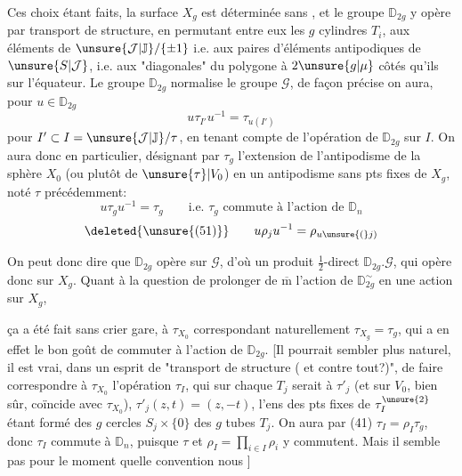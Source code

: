 


Ces choix étant faits, la surface $X_g$ est déterminée sans
, et le groupe $\mathbb D_{2g}$ y opère par transport de
structure, en permutant entre eux les $g$ cylindres $T_i$,
 aux éléments de
$\unsure{\mathcal J|\mathbb J}/\{\pm1\}$ i.e.
aux paires d'éléments antipodiques de $\unsure{S|\mathcal J}$,
i.e. aux "diagonales" du polygone à $2\unsure{g|\mu}$ côtés
qu'ils 
sur l'équateur. Le groupe $\mathbb D_{2g}$ normalise
 le groupe $\mathcal G$, de façon précise
on aura, pour $u\in\mathbb D_{2g}$
\[
\tag{49}
u\tau_{I'}u^{-1}=\tau_{u(I')}
\]
pour $I'\subset I=\unsure{\mathcal J|\mathbb J}/\tau$, en tenant compte de
l'opération de $\mathbb D_{2g}$ sur $I$. On aura donc en
particulier, désignant par $\tau_g$\inserted{$=\tau_\varnothing$}
l'extension  de l'antipodisme de la sphère $X_0$
(ou plutôt de $\unsure{\tau}\vert V_0$) en un antipodisme
sans pts fixes de $X_g$, noté $\tau$ précédemment:
\[
\tag{50}
u\tau_g u^{-1}=\tau_g
\qquad\text{i.e. $\tau_g$ commute à l'action de $\mathbb D_n$}
\]
\[
\deleted{\unsure{(51)}}\qquad
u\rho_j u^{-1}=\rho_{u\unsure{(}j)}
\]

On peut donc dire que $\mathbb D_{2g}$ opère sur $\mathcal G$,
d'où un produit $\frac12$-direct $\mathbb D_{2g}.\mathcal G$,
qui opère donc sur $X_g$.
Quant à la question de prolonger de $\overline{\mathrm m}$
l'action  de $\mathbb D_{2g}^\sim$
  en une action sur $X_g$,



ça a été fait sans crier gare, à $\tau_{X_0}$ correspondant
naturellement $\tau_{X_g}=\tau_g$, qui a en effet le bon goût
de commuter à l'action de $\mathbb D_{2g}$.
[Il pourrait sembler plus naturel, il est vrai, dans un
esprit de "transport de structure ( et contre
tout?)", de faire correspondre à $\tau_{X_0}$ l'opération
$\tau_I$, qui sur
chaque $T_j$ serait  à $\tau'_j$
(et sur $V_0$, bien sûr, coïncide avec $\tau_{X_0}$),
$\tau'_j(z,t)=(z,-t)$,
 l'ens des pts fixes de $\tau_I^{\unsure{2}}$
étant formé des $g$ cercles  $S_j\times\{0\}$
des $g$ tubes $T_j$. On aura par (41)
$\tau_I=\rho_I\tau_g$, donc $\tau_I$ commute
 à $\mathbb D_n$, puisque $\tau$ et
$\rho_I=\prod_{i\in I}\rho_i$ y commutent.
Mais il  semble pas  pour le moment
quelle convention nous ]

